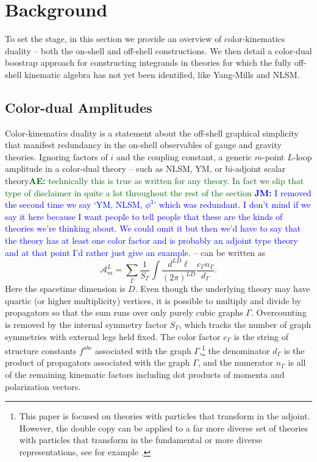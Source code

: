 \documentclass[11pt,letter]{article}
\newcommand{\ace}[1]{\textcolor{darkgreen}{\textbf{AE:}{ #1}}}
\newcommand{\jm}[1]{\textcolor{blue}{\textbf{JM: }{#1}}}
\begin{document}
\section{Background}\label{background}
To set the stage, in this section we provide an overview of
color-kinematics duality -- both the on-shell and off-shell
constructions. We then detail a color-dual boostrap approach for
constructing integrands in theories for which the fully off-shell kinematic
algebra has not yet been identified, like Yang-Mills and NLSM.
\subsection{Color-dual Amplitudes}\label{onShellCK}

Color-kinematics duality is a statement about the off-shell graphical
simplicity that manifest redundancy in the on-shell observables of
gauge and gravity theories. Ignoring factors of $i$ and the coupling
constant, a generic $m$-point $L$-loop amplitude in a color-dual
theory -- such as NLSM, YM, or bi-adjoint scalar
theory\ace{technically this is true as written for any theory.  In
  fact we slip that type of disclaimer in quite a lot throughout the
  rest of the section} \jm{I removed the second time we say `YM, NLSM, $\phi^3$' which was redundant.  I don't mind if we say it here because I want people to tell people that these are the kinds of theories we're thinking about.  We could omit it but then we'd have to say that the theory has at least one color factor and is probably an adjoint type theory and at that point I'd rather just give an example.} -- can be written as
\begin{equation}
\mathcal{A}_m^L = \sum \limits_\Gamma \frac{1}{S_\Gamma} \int \frac{d^{LD}\ell}{(2\pi)^{LD}} \frac{c_\Gamma n_\Gamma}{d_\Gamma} .
\end{equation}
Here the spacetime dimension is $D$.  Even though the underlying
theory may have quartic (or higher multiplicity) vertices, it is
possible to multiply and divide by propagators so that the sum runs
over only purely cubic graphs $\Gamma$.  Overcounting is removed by
the internal symmetry factor $S_\Gamma$, which tracks the number of
graph symmetries with external legs held fixed.  The color factor
$c_\Gamma$ is the string of structure constants $f^{abc}$ associated
with the graph $\Gamma$,\footnote{This paper is focused on theories
  with particles that transform in the adjoint.  However, the double
  copy can be applied to a far more diverse set of theories with
  particles that transform in the fundamental or more diverse
  representations, see for example \cite{Johansson:2017srf,
    Johansson2014zca, Johansson:2015oia, Johansson:2019dnu,
    Carrasco:2023vjg, Carrasco:2020ywq}.}  the denominator $d_\Gamma$
is the product of propagators associated with the graph $\Gamma$, and
the numerator $n_\Gamma$ is all of the remaining kinematic factors
including dot products of momenta and polarization vectors.
\end{document}

